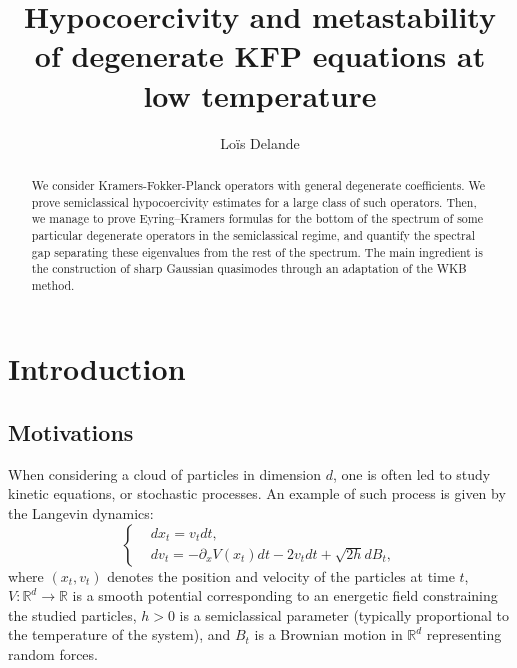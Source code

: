 \documentclass[12pt]{amsart}
\title{Hypocoercivity and metastability of degenerate KFP equations at low temperature}
\author{Loïs Delande}
\newcommand{\R}{\mathbb R}
\numberwithin{equation}{section}
\numberwithin{figure}{section}
\begin{document}
\begin{abstract}
We consider Kramers-Fokker-Planck operators with general degenerate coefficients. We prove semiclassical hypocoercivity estimates for a large class of such operators. Then, we manage to prove Eyring–Kramers formulas for the bottom of the spectrum of some particular degenerate operators in the semiclassical regime, and quantify the spectral gap separating these eigenvalues from the rest of the spectrum. The main ingredient is the construction of sharp Gaussian quasimodes through an adaptation of the WKB method.
\end{abstract}

\maketitle

\section{Introduction}

\subsection{Motivations}

When considering a cloud of particles in dimension $d$, one is often led to study kinetic equations, or stochastic processes. An example of such process is given by the Langevin dynamics:
\begin{equation}\label{eq:SDE0}
\left\{
\begin{aligned}
&dx_t = v_tdt,\\
&dv_t = -\partial_xV(x_t)dt - 2v_tdt + \sqrt{2h}dB_t,
\end{aligned}
\right.
\end{equation}
where $(x_t,v_t)$ denotes the position and velocity of the particles at time $t$, $V:\R^d\to\R$ is a smooth potential corresponding to an energetic field constraining the studied particles, $h>0$ is a semiclassical parameter (typically proportional to the temperature of the system), and $B_t$ is a Brownian motion in $\R^d$ representing random forces.
\end{document}
